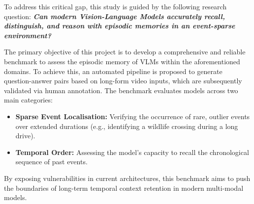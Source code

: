 \documentclass[journal]{IEEEtran}
\begin{document}
To address this critical gap, this study is guided by the following research question: \textit{\textbf{Can modern Vision-Language Models accurately recall, distinguish, and reason with episodic memories in an event-sparse environment?}}

The primary objective of this project is to develop a comprehensive and reliable benchmark to assess the episodic memory of VLMs within the aforementioned domains. To achieve this, an automated pipeline is proposed to generate question-answer pairs based on long-form video inputs, which are subsequently validated via human annotation. The benchmark evaluates models across two main categories:
\begin{itemize} 
\item \textbf{Sparse Event Localisation:} Verifying the occurrence of rare, outlier events over extended durations (e.g., identifying a wildlife crossing during a long drive). 
\item \textbf{Temporal Order:} Assessing the model's capacity to recall the chronological sequence of past events. 
\end{itemize}

By exposing vulnerabilities in current architectures, this benchmark aims to push the boundaries of long-term temporal context retention in modern multi-modal models.
\end{document}

